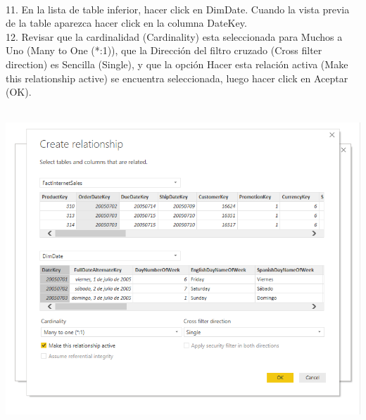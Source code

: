 \begin{flushleft}
\begin{itemize}
\begin{center}
	\end{center}
\textbf{ }\\
\textbf{ }\\
\textbf{ }\\
\textbf{ }\\
\textbf{ }\\
\textbf{ }\\
\textbf{ }\\
\textbf{ }\\
\textbf{ }\\
\textbf{ }\\
\textbf{ }\\
11. En la lista de table inferior, hacer click en DimDate. Cuando la vista previa de la table aparezca hacer click
en la columna DateKey.\\
12. Revisar que la cardinalidad (Cardinality) esta seleccionada para Muchos a Uno (Many to One (*:1)), que la
Dirección del filtro cruzado (Cross filter direction) es Sencilla (Single), y que la opción Hacer esta relación
activa (Make this relationship active) se encuentra seleccionada, luego hacer click en Aceptar (OK).\\
\textbf{ }\\
\begin{center}
	\includegraphics[width=20cm]{./Imagenes/img5} 
	\end{center}
\textbf{ }\\
\textbf{ }\\
\textbf{ }\\
\textbf{ }\\


\end{itemize}
\end{flushleft}
